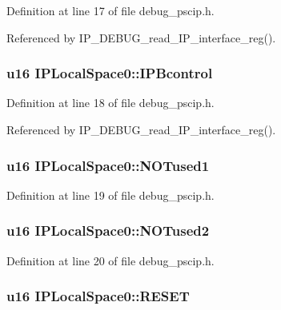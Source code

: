 Definition at line 17 of file debug\_\-pscip.h.

Referenced by IP\_\-DEBUG\_\-read\_\-IP\_\-interface\_\-reg().\hypertarget{struct_i_p_local_space0_ff21316bc78314d0cb5268813731e848}{
\subsubsection[{IPBcontrol}]{\setlength{\rightskip}{0pt plus 5cm}u16 {\bf IPLocalSpace0::IPBcontrol}}}
\label{struct_i_p_local_space0_ff21316bc78314d0cb5268813731e848}




Definition at line 18 of file debug\_\-pscip.h.

Referenced by IP\_\-DEBUG\_\-read\_\-IP\_\-interface\_\-reg().\hypertarget{struct_i_p_local_space0_5dc9959fb4d52e5a232cbbc8e25b76d1}{
\subsubsection[{NOTused1}]{\setlength{\rightskip}{0pt plus 5cm}u16 {\bf IPLocalSpace0::NOTused1}}}
\label{struct_i_p_local_space0_5dc9959fb4d52e5a232cbbc8e25b76d1}




Definition at line 19 of file debug\_\-pscip.h.\hypertarget{struct_i_p_local_space0_0b2e97e91a1b29e824d8a44a391d52b0}{
\subsubsection[{NOTused2}]{\setlength{\rightskip}{0pt plus 5cm}u16 {\bf IPLocalSpace0::NOTused2}}}
\label{struct_i_p_local_space0_0b2e97e91a1b29e824d8a44a391d52b0}




Definition at line 20 of file debug\_\-pscip.h.\hypertarget{struct_i_p_local_space0_5cc8b5858012191071e1ec74286067c7}{
\subsubsection[{RESET}]{\setlength{\rightskip}{0pt plus 5cm}u16 {\bf IPLocalSpace0::RESET}}}
\label{struct_i_p_local_space0_5cc8b5858012191071e1ec74286067c7}





